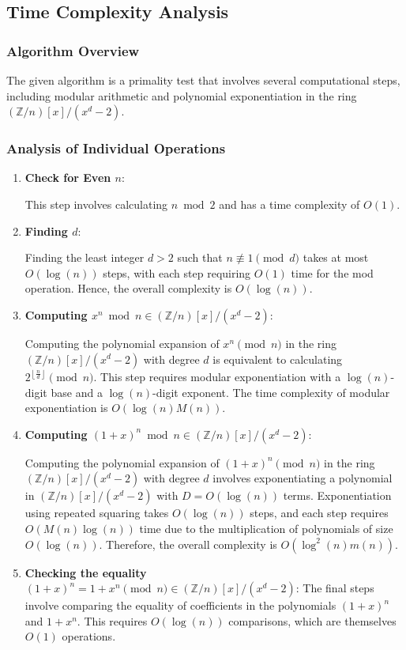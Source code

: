 \documentclass{article}
\theoremstyle{plain}
\theoremstyle{definition}
\newcommand{\floor}[1]{\left\lfloor #1 \right\rfloor}
\newcommand{\Z}{\mathbb{Z}}
\newcommand{\Zn}{\Z/n}
\newcommand{\Mx}{(\Zn)[x]/(x^d-2)}
\begin{document}
\subsection{Time Complexity Analysis} \label{subsection:timecomplexity}

\subsubsection{Algorithm Overview}
The given algorithm is a primality test that involves several computational steps, including modular arithmetic and polynomial exponentiation in the ring $\Mx$.

\subsubsection{Analysis of Individual Operations}
\begin{enumerate}
    \item \textbf{Check for Even \( n \)}:
    
        This step involves calculating $n \bmod{2}$ and has a time complexity of \( O(1) \).

    \item \textbf{Finding \( d \)}:
    
        Finding the least integer \( d > 2 \) such that $n \not\equiv 1 \pmod{d}$ takes at most \( O(\log(n)) \) steps, with each step requiring \( O(1) \) time for the mod operation. Hence, the overall complexity is \( O(\log(n)) \).

    \item \textbf{Computing \( x^n \bmod{n} \in \Mx \)}:
    
        Computing the polynomial expansion of $x^n \pmod{n}$ in the ring \( \Mx \) with degree $d$ is equivalent to calculating $2^{\floor{\frac{n}{d}}} \pmod{n}$. This step requires modular exponentiation with a \( \log(n) \)-digit base and a \( \log(n) \)-digit exponent. The time complexity of modular exponentiation is \( O(\log(n) M(n)) \).

    \item \textbf{Computing \( (1+x)^n \bmod{n} \in \Mx \)}:
    
        Computing the polynomial expansion of \( (1+x)^n \pmod{n} \) in the ring \( (\Zn)[x]/(x^d-2) \)  with degree $d$ involves exponentiating a polynomial in $(\Zn)[x]/(x^d-2)$ with \( D = O(\log(n)) \) terms. Exponentiation using repeated squaring takes \( O(\log(n)) \) steps, and each step requires \( O(M(n)\log(n)) \) time due to the multiplication of polynomials of size \( O(\log(n)) \). Therefore, the overall complexity is \( O(\log^2(n) m(n)) \).
         
    \item \textbf{Checking the equality \( (1+x)^n = 1 + x^n \pmod{n} \in (\Zn)[x]/(x^d-2) \)}:
        The final steps involve comparing the equality of coefficients in the polynomials $(1+x)^n$ and $1 + x^n$. This requires $O(\log(n))$ comparisons, which are themselves \( O(1) \) operations.
\end{enumerate}
\end{document}
